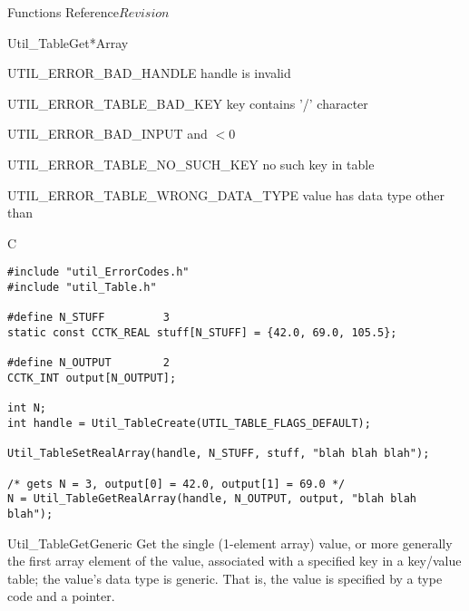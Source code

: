 \begin{cactuspart}{ Functions Reference}{}{$Revision$}
\begin{FunctionDescription}{Util\_TableGet*Array}
\begin{ErrorSection}
\begin{Error}{UTIL\_ERROR\_BAD\_HANDLE}
handle is invalid
\end{Error}
\begin{Error}{UTIL\_ERROR\_TABLE\_BAD\_KEY}
key contains '/' character
\end{Error}
\begin{Error}{UTIL\_ERROR\_BAD\_INPUT}
 and  $< 0$
\end{Error}
\begin{Error}{UTIL\_ERROR\_TABLE\_NO\_SUCH\_KEY}
no such key in table
\end{Error}
\begin{Error}{UTIL\_ERROR\_TABLE\_WRONG\_DATA\_TYPE}
value has data type other than 
\end{Error}
\end{ErrorSection}

\begin{ExampleSection}
\begin{Example}{C}
\begin{verbatim}
#include "util_ErrorCodes.h"
#include "util_Table.h"

#define N_STUFF         3
static const CCTK_REAL stuff[N_STUFF] = {42.0, 69.0, 105.5};

#define N_OUTPUT        2
CCTK_INT output[N_OUTPUT];

int N;
int handle = Util_TableCreate(UTIL_TABLE_FLAGS_DEFAULT);

Util_TableSetRealArray(handle, N_STUFF, stuff, "blah blah blah");

/* gets N = 3, output[0] = 42.0, output[1] = 69.0 */
N = Util_TableGetRealArray(handle, N_OUTPUT, output, "blah blah blah");
\end{verbatim}
\end{Example}
\end{ExampleSection}
\end{FunctionDescription}


\begin{FunctionDescription}{Util\_TableGetGeneric}
\label{Util-TableGetGeneric}
Get the single (1-element array) value, or more generally the
first array element of the value, associated with a specified key
in a key/value table; the value's data type is generic.  That
is, the value is specified by a  type code
and a  pointer.


\end{FunctionDescription}
\end{cactuspart}
